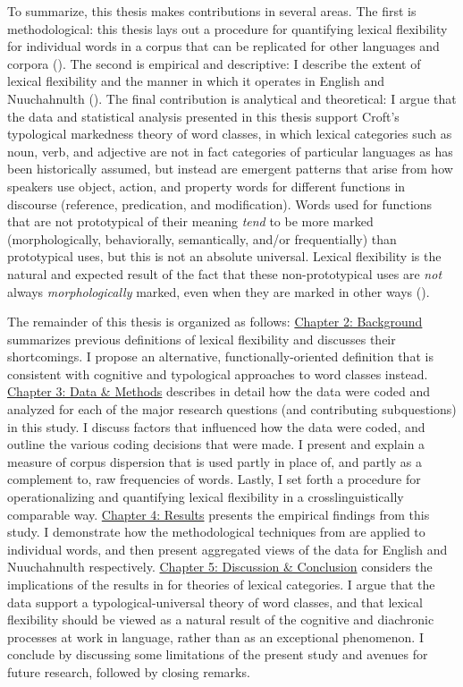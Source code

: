 To summarize, this thesis makes contributions in several areas. The first is methodological: this thesis lays out a procedure for quantifying lexical flexibility for individual words in a corpus that can be replicated for other languages and corpora (). The second is empirical and descriptive: I describe the extent of lexical flexibility and the manner in which it operates in English and Nuuchahnulth (). The final contribution is analytical and theoretical: I argue that the data and statistical analysis presented in this thesis support Croft's typological markedness theory of word classes, in which lexical categories such as noun, verb, and adjective are not in fact categories of particular languages as has been historically assumed, but instead are emergent patterns that arise from how speakers use object, action, and property words for different functions in discourse (reference, predication, and modification). Words used for functions that are not prototypical of their meaning \emph{tend} to be more marked (morphologically, behaviorally, semantically, and/or frequentially) than prototypical uses, but this is not an absolute universal. Lexical flexibility is the natural and expected result of the fact that these non-prototypical uses are \emph{not} always \emph{morphologically} marked, even when they are marked in other ways ().

The remainder of this thesis is organized as follows: \hyperref[ch:background]{Chapter 2: Background} summarizes previous definitions of lexical flexibility and discusses their shortcomings. I propose an alternative, functionally-oriented definition that is consistent with cognitive and typological approaches to word classes instead. \hyperref[ch:background]{Chapter 3: Data \& Methods} describes in detail how the data were coded and analyzed for each of the major research questions (and contributing subquestions) in this study. I discuss factors that influenced how the data were coded, and outline the various coding decisions that were made. I present and explain a measure of corpus dispersion that is used partly in place of, and partly as a complement to, raw frequencies of words. Lastly, I set forth a procedure for operationalizing and quantifying lexical flexibility in a crosslinguistically comparable way. \hyperref[ch:background]{Chapter 4: Results} presents the empirical findings from this study. I demonstrate how the methodological techniques from  are applied to individual words, and then present aggregated views of the data for English and Nuuchahnulth respectively. \hyperref[ch:background]{Chapter 5: Discussion \& Conclusion} considers the implications of the results in  for theories of lexical categories. I argue that the data support a typological-universal theory of word classes, and that lexical flexibility should be viewed as a natural result of the cognitive and diachronic processes at work in language, rather than as an exceptional phenomenon. I conclude by discussing some limitations of the present study and avenues for future research, followed by closing remarks.
